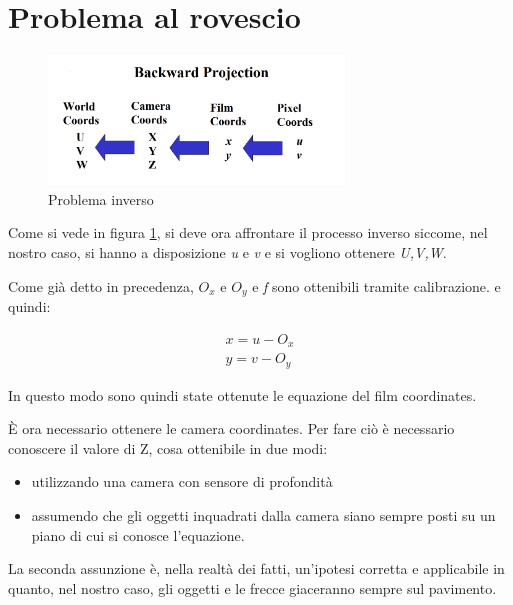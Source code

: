 \section{Problema al rovescio}
\begin{figure}[H]
	\centering
	\includegraphics[width=0.7\textwidth]{Immagini/backward.png}
	\caption{Problema inverso}
	\label{fig:backward}
\end{figure}

Come si vede in figura \ref{fig:backward}, si deve ora affrontare il processo inverso siccome, nel nostro caso, si hanno a disposizione \textit{u} e \textit{v} e si vogliono ottenere \textit{U,V,W}.

Come già detto in precedenza, $ O_{x}$ e $ O_{y} $ e \textit{f} sono ottenibili tramite calibrazione. e quindi:

\begin{equation}
\begin{split}
x = u -O_{x}\\
y = v -O_{y}
\end{split}
\end{equation}

In questo modo sono quindi state ottenute le equazione del film coordinates. 

È ora necessario ottenere le camera coordinates. Per fare ciò è necessario conoscere il valore di Z, cosa ottenibile in due modi:
\begin{itemize}
	\item utilizzando una camera con sensore di profondità
	\item assumendo che gli oggetti inquadrati dalla camera siano sempre posti su un piano di cui si conosce l'equazione.
\end{itemize}
La seconda assunzione è, nella realtà dei fatti, un'ipotesi corretta e applicabile in quanto, nel nostro caso, gli oggetti e le frecce giaceranno sempre sul pavimento.

